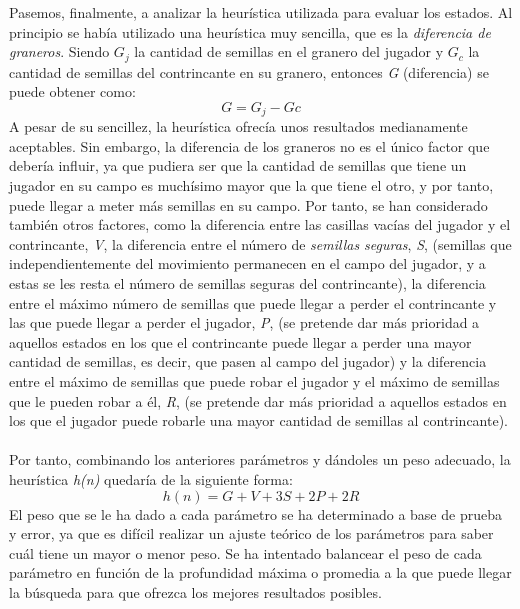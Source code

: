 \documentclass{article}
\begin{document}
  Pasemos, finalmente, a analizar la heurística utilizada para evaluar los estados. Al principio se había utilizado una heurística muy sencilla, que es la \textit{diferencia de graneros}. Siendo $G_{j}$ la cantidad de semillas en el granero del jugador y $G_{c}$ la cantidad de semillas del contrincante en su granero, entonces \textit{G} (diferencia) se puede obtener como:
  \[G = G_{j} - G{c}\]
  A pesar de su sencillez, la heurística ofrecía unos resultados medianamente aceptables. Sin embargo, la diferencia de los graneros no es el único factor que debería influir, ya que pudiera ser que la cantidad de semillas que tiene un jugador en su campo es muchísimo mayor que la que tiene el otro, y por tanto, puede llegar a meter más semillas en su campo. Por tanto, se han considerado también otros factores, como la diferencia entre las casillas vacías del jugador y el contrincante, \textit{V}, la diferencia entre el número de \textit{semillas seguras}, \textit{S}, (semillas que independientemente del movimiento permanecen en el campo del jugador, y a estas se les resta el número de semillas seguras del contrincante), la diferencia entre el máximo número de semillas que puede llegar a perder el contrincante y las que puede llegar a perder el jugador, \textit{P}, (se pretende dar más prioridad a aquellos estados en los que el contrincante puede llegar a perder una mayor cantidad de semillas, es decir, que pasen al campo del jugador) y la diferencia entre el máximo de semillas que puede robar el jugador y el máximo de semillas que le pueden robar a él, \textit{R}, (se pretende dar más prioridad a aquellos estados en los que el jugador puede robarle una mayor cantidad de semillas al contrincante).\\\\
  Por tanto, combinando los anteriores parámetros y dándoles un peso adecuado, la heurística \textit{h(n)} quedaría de la siguiente forma:
  \[h(n) = G + V + 3S + 2P + 2R\]
  El peso que se le ha dado a cada parámetro se ha determinado a base de prueba y error, ya que es difícil realizar un ajuste teórico de los parámetros para saber cuál tiene un mayor o menor peso. Se ha intentado balancear el peso de cada parámetro en función de la profundidad máxima o promedia a la que puede llegar la búsqueda para que ofrezca los mejores resultados posibles.
  
\end{document}
